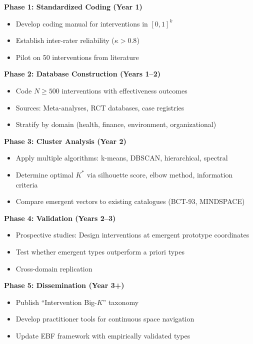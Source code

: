 \begin{tcolorbox}[colback=yellow!5!white, colframe=yellow!75!black,
    title=\textbf{5-Phase Research Program for Emergent Intervention Types}]

\textbf{Phase 1: Standardized Coding (Year 1)}
\begin{itemize}[nosep]
    \item Develop coding manual for interventions in $[0,1]^k$
    \item Establish inter-rater reliability ($\kappa > 0.8$)
    \item Pilot on 50 interventions from literature
\end{itemize}

\textbf{Phase 2: Database Construction (Years 1--2)}
\begin{itemize}[nosep]
    \item Code $N \geq 500$ interventions with effectiveness outcomes
    \item Sources: Meta-analyses, RCT databases, case registries
    \item Stratify by domain (health, finance, environment, organizational)
\end{itemize}

\textbf{Phase 3: Cluster Analysis (Year 2)}
\begin{itemize}[nosep]
    \item Apply multiple algorithms: k-means, DBSCAN, hierarchical, spectral
    \item Determine optimal $K^*$ via silhouette score, elbow method, information criteria
    \item Compare emergent vectors to existing catalogues (BCT-93, MINDSPACE)
\end{itemize}

\textbf{Phase 4: Validation (Years 2--3)}
\begin{itemize}[nosep]
    \item Prospective studies: Design interventions at emergent prototype coordinates
    \item Test whether emergent types outperform a priori types
    \item Cross-domain replication
\end{itemize}

\textbf{Phase 5: Dissemination (Year 3+)}
\begin{itemize}[nosep]
    \item Publish ``Intervention Big-$K$'' taxonomy
    \item Develop practitioner tools for continuous space navigation
    \item Update EBF framework with empirically validated types
\end{itemize}

\end{tcolorbox}

